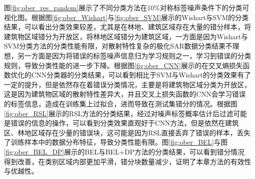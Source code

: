 图\ref{fig:ober_res_random}展示了不同分类方法在10\%对称标签噪声条件下的分类可视化图。根据图\ref{fig:ober_Wishart}与\ref{fig:ober_SVM}展示的Wishart与SVM的分类结果，可以看出分类效果较差，尤其是在林地、建筑区域存在大量的错分样本，将建筑物区域错分为开放区，将林地区域错分为建筑区域，一方面是因为Wishart与SVM分类方法的分类性能有限，对散射特性复杂的极化SAR数据分类结果不理想，另一方面是因为将错误的标签噪声信息归为学习规则之一，学习到错误的分类规则，导致分类性能的进一步下降。根据图\ref{fig:ober_CNN}展示的在交叉熵损失函数优化的CNN分类器的分类结果，可以看到相比于SVM与Wishart的分类效果有了一定的提升，但是依然存在着错误分类情况，主要是将建筑物区域分类为开放区，这是因为建筑物区域的散射特性差异大，并且交叉上损失函数的CNN会学习错误的标签信息，造成在训练集上过拟合，进而导致在测试集错分的情况。根据图\ref{fig:ober_RSL}展示的RSL方法的分类结果，经过对噪声标签概率估计后过滤可能是错误的信息的操作，可以看到分类效果直观好于CNN方法，但是依然在建筑区、林地区域存在少量的错误块，这可能是因为RSL直接丢弃了错误的样本，丢失了训练样本中的数据分布特征，导致分类性能有限。图\ref{fig:ober_BEL}与图\ref{fig:ober_BEL_DP}展示的BEL与BEL+DP方法的分类结果，可以看到错分情况得到改善，在类别区域内部更加平滑，错分块数量减少，证明了本章方法的有效性与优越性。
